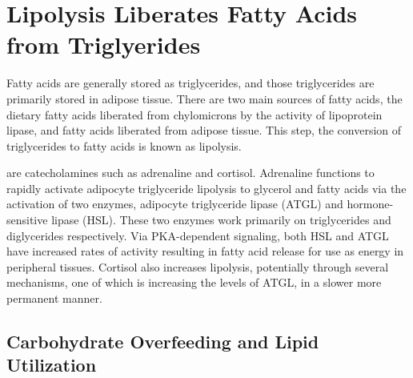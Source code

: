 \documentclass{tufte-handout}
\begin{document}
\section{Lipolysis Liberates Fatty Acids from Triglyerides}
Fatty acids are generally stored as triglycerides, and those triglycerides are primarily stored in adipose tissue.  There are two main sources of fatty acids, the dietary fatty acids liberated from chylomicrons by the activity of lipoprotein lipase, and fatty acids liberated from adipose tissue.  This step, the conversion of triglycerides to fatty acids is known as lipolysis.

 are catecholamines such as adrenaline and cortisol.  Adrenaline functions to rapidly activate adipocyte triglyceride lipolysis to glycerol and fatty acids via the activation of two enzymes, adipocyte triglyceride lipase (ATGL) and hormone-sensitive lipase (HSL).  These two enzymes work primarily on triglycerides and diglycerides respectively.  Via PKA-dependent signaling, both HSL and ATGL have increased rates of activity resulting in fatty acid release for use as energy in peripheral tissues.  Cortisol also increases lipolysis, potentially through several mechanisms, one of which is increasing the levels of ATGL, in a slower more permanent manner.  

\subsection{Carbohydrate Overfeeding and Lipid Utilization}
\end{document}
